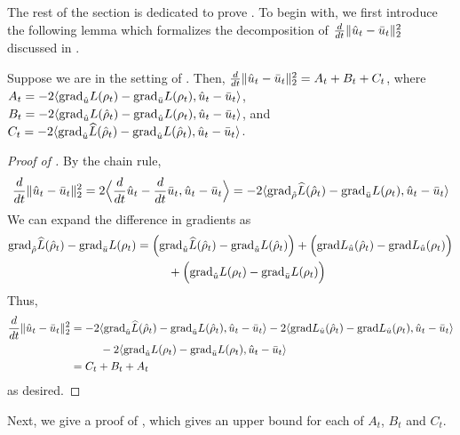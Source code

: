 The rest of the section is dedicated to prove . To begin with, we first introduce the following lemma which formalizes the decomposition of $\frac{d}{dt} \|\hat{u}_t-\bar{u}_t\|_2^2$ discussed in .
\begin{lemma} \label{lemma:delta_decomposition_ABC}
Suppose we are in the setting of . Then, $\frac{d}{dt} \|\hat{u}_t-\bar{u}_t\|_2^2 = A_t + B_t + C_t$, where $A_t =- 2 \langle {\textup{grad}}_{\hat{u}} L(\rho_t) - {\textup{grad}}_{\bar{u}} L(\rho_t), \hat{u}_t - \bar{u}_t \rangle$, $B_t = -2 \langle {\textup{grad}}_{\hat{u}} L({\hat{\rho}}_t) - {\textup{grad}}_{\hat{u}} L(\rho_t), \hat{u}_t - \bar{u}_t \rangle$, and $C_t = -2 \langle {\textup{grad}}_{\hat{u}} \widehat{L}({\hat{\rho}}_t) - {\textup{grad}}_{\hat{u}} L({\hat{\rho}}_t), \hat{u}_t - \bar{u}_t \rangle$. 
\end{lemma}
\begin{proof}[Proof of ]
By the chain rule,
\begin{align}
 \frac{d}{dt} \| \hat{u}_t - \bar{u}_t \|_2^2   = 2 \Big\langle \frac{d}{dt} \hat{u}_t - \frac{d}{dt} \bar{u}_t, \hat{u}_t - \bar{u}_t \Big\rangle 
 = -2 \langle {\textup{grad}}_{{\hat{\rho}}} \widehat{L}({\hat{\rho}}_t) - {\textup{grad}}_{\bar{u}} L(\rho_t), \hat{u}_t - \bar{u}_t \rangle
\end{align}
We can expand the difference in gradients as
\begin{align}
{\textup{grad}}_{{\hat{\rho}}} \widehat{L}({\hat{\rho}}_t) - {\textup{grad}}_{\bar{u}} L(\rho_t)
& = \Big( {\textup{grad}}_{\hat{u}} \widehat{L}({\hat{\rho}}_t) - {\textup{grad}}_{\hat{u}} L({\hat{\rho}}_t) \Big) + \Big({\textup{grad}} L_{\hat{u}}({\hat{\rho}}_t) - {\textup{grad}} L_{\hat{u}}(\rho_t) \Big) \\ 
& \,\,\,\,\,\,\,\,\,\,\,\,\,\,\,\, + \Big({\textup{grad}}_{\hat{u}} L(\rho_t) - {\textup{grad}}_{\bar{u}} L(\rho_t) \Big)
\end{align}
Thus,
\begin{align}
\frac{d}{dt} \| \hat{u}_t - \bar{u}_t \|_2^2
& = -2 \langle {\textup{grad}}_{\hat{u}} \widehat{L}({\hat{\rho}}_t) - {\textup{grad}}_{\hat{u}} L({\hat{\rho}}_t), \hat{u}_t - \bar{u}_t \rangle - 2 \langle {\textup{grad}} L_{\hat{u}}({\hat{\rho}}_t) - {\textup{grad}} L_{\hat{u}}(\rho_t) , \hat{u}_t - \bar{u}_t \rangle \\
& \,\,\,\,\,\,\,\,\,\,\,\,\,\,\,\, - 2 \langle {\textup{grad}}_{\hat{u}} L(\rho_t) - {\textup{grad}}_{\bar{u}} L(\rho_t), \hat{u}_t - \bar{u}_t \rangle \\
& = C_t + B_t + A_t
\end{align}
as desired.
\end{proof}

Next, we give a proof of , which gives an upper bound for each of $A_t$, $B_t$ and $C_t$.


